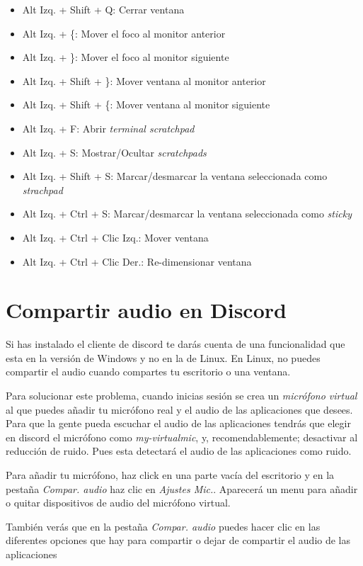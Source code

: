 \documentclass[12pt]{article}
\begin{document}
\begin{itemize}
\item Alt Izq. + Shift + Q: Cerrar ventana
\item Alt Izq. + \{: Mover el foco al monitor anterior
\item Alt Izq. + \}: Mover el foco al monitor siguiente
\item Alt Izq. + Shift + \}: Mover ventana al monitor anterior
\item Alt Izq. + Shift + \{: Mover ventana al monitor siguiente
\item Alt Izq. + F: Abrir \emph{terminal scratchpad}
\item Alt Izq. + S: Mostrar/Ocultar \emph{scratchpads}
\item Alt Izq. + Shift + S: Marcar/desmarcar la ventana seleccionada como \emph{strachpad}
\item Alt Izq. + Ctrl + S: Marcar/desmarcar la ventana seleccionada como \emph{sticky}
\item Alt Izq. + Ctrl + Clic Izq.: Mover ventana
\item Alt Izq. + Ctrl + Clic Der.: Re-dimensionar ventana
\end{itemize}

\section{Compartir audio en Discord}

Si has instalado el cliente de discord te darás cuenta de una funcionalidad que esta en la versión de Windows y no en la de Linux. En Linux, no puedes compartir el audio cuando compartes tu escritorio o una ventana.

Para solucionar este problema, cuando inicias sesión se crea un \emph{micrófono virtual} al que puedes añadir tu micrófono real y el audio de las aplicaciones que desees. Para que la gente pueda escuchar el audio de las aplicaciones tendrás que elegir en discord el micrófono como \emph{my-virtualmic}, y, recomendablemente; desactivar al reducción de ruido. Pues esta detectará el audio de las aplicaciones como ruido.

Para añadir tu micrófono, haz click en una parte vacía del escritorio y en la pestaña \emph{Compar. audio} haz clic en \emph{Ajustes Mic.}. Aparecerá un menu para añadir o quitar dispositivos de audio del micrófono virtual.

También verás que en la pestaña \emph{Compar. audio} puedes hacer clic en las diferentes opciones que hay para compartir o dejar de compartir el audio de las aplicaciones
\end{document}
